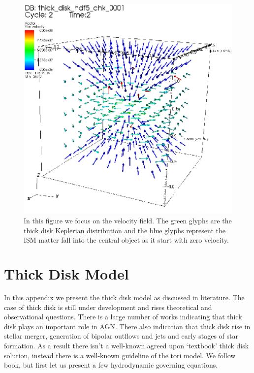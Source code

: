 \documentclass[a4paper,12pt,modern]{aastex62}
\begin{document}
\begin{figure}[ht!]
\includegraphics[width=\linewidth]{visit_vel_1.eps}
\caption{In this figure we focus on the velocity field. The green glyphs are the thick disk Keplerian distribution and the blue glyphs represent the ISM matter fall into the central object as it start with zero velocity.}\label{fig:preliminary-result-velocity}
\end{figure}



\section{Thick Disk Model\label{app:thick_disk_model}}
In this appendix we present the thick disk model as discussed in literature. The case of thick disk is still under development and rises theoretical and observational questions. There is a large number of works indicating that thick disk plays an important role in AGN. There also indication that thick disk rise in stellar merger, generation of bipolar outflows and jets and early stages of star formation.
As a result there isn't a well-known agreed upon `textbook' thick disk solution, instead there is a well-known guideline of the tori model.
We follow \cite{2002apa..book.....F} book, but first let us present a few hydrodynamic governing equations.
\end{document}
